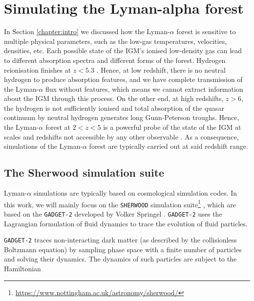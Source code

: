 \chapter{Simulating the Lyman-alpha forest} \label{chap:sherwood}
In Section \ref{chapter:intro} we discussed how the Lyman-$\alpha$ forest is sensitive to multiple physical parameters, such as the low-gas temperatures, velocities, densities, etc. Each possible state of the IGM's ionised low-density gas can lead to different absorption spectra and different forms of the forest. Hydrogen reionisation finishes at $z<5.3$ \cite{Bosman_2022}. Hence, at low redshift, there is no neutral hydrogen to produce absorption features, and we have complete transmission of the Lyman-$\alpha$ flux without features, which means we cannot extract information about the IGM through this process. On the other end, at high redshifts, $z>6$, the hydrogen is not sufficiently ionised and total absorption of the quasar continuum by neutral hydrogen generates long Gunn-Peterson troughs.
Hence, the Lyman-$\alpha$ forest at $2<z<5$ is a powerful probe of the state of the IGM at scales and redshifts not accessible by any other observable \cite{Hernquist__1996}. As a consequence, simulations of the Lyman-$\alpha$ forest are typically carried out at said redshift range.














\section{The Sherwood simulation suite}\label{sec:sherwood suite}
Lyman-$\alpha$ simulations are typically based on cosmological simulation codes.
In this work, we will mainly focus on the \texttt{SHERWOOD} simulation suite\footnote{\url{https://www.nottingham.ac.uk/astronomy/sherwood/}} \cite{Bolton_2016}, which are based on the \texttt{GADGET-2} developed by Volker Springel \cite{Springel_2005}. \texttt{GADGET-2} uses the Lagrangian formulation of fluid dynamics to trace the evolution of fluid particles.


\texttt{GADGET-2} traces non-interacting dark matter (as described by the collisionless Boltzmann equation) by sampling phase space with a finite number of particles and solving their dynamics. The dynamics of such particles are subject to the Hamiltonian

